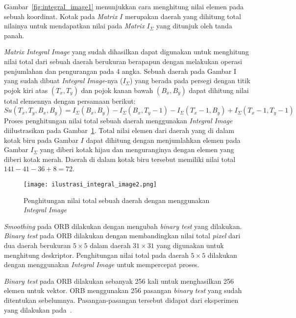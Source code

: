 Gambar~\ref{fig:integral_image1} menunjukkan cara menghitung nilai elemen pada sebuah koordinat. Kotak pada \textit{Matrix} $I$ merupakan daerah yang dihitung total nilainya untuk mendapatkan nilai pada \textit{Matrix} $I_\Sigma$ yang ditunjuk oleh tanda panah. 

\textit{Matrix Integral Image} yang sudah dihasilkan dapat digunakan untuk menghitung nilai total dari sebuah daerah berukuran berapapun dengan melakukan operasi penjumlahan dan pengurangan pada 4 angka. Sebuah daerah pada Gambar I yang sudah dibuat \textit{Integral Image}-nya ($I_\Sigma$) yang berada pada persegi dengan titik pojok kiri atas $(T_x, T_y)$ dan pojok kanan bawah $(B_x, B_y)$ dapat dihitung nilai total elemennya dengan persamaan berikut:
\begin{equation}
	Su(T_x, T_y, B_x, B_y) = I_\Sigma(B_x, B_y) - I_\Sigma(B_x, T_y-1) - I_\Sigma(T_x-1, B_y) + I_\Sigma(T_x-1,T_y-1)
\end{equation}
Proses penghitungan nilai total sebuah daerah menggunakan \textit{Integral Image} diilustrasikan pada Gambar~\ref{fig:integral_image2}. Total nilai elemen dari daerah yang di dalam kotak biru pada Gambar $I$ dapat dihitung dengan menjumlahkan elemen pada Gambar $I_\Sigma$ yang diberi kotak hijau dan menguranginya dengan elemen yang diberi kotak merah. Daerah di dalam kotak biru tersebut memiliki nilai total $141-41-36+8=72$.
\begin{figure}[H]
	\centering
	\texttt{[image: ilustrasi\_integral\_image2.png]}
	\caption{Penghitungan nilai total sebuah daerah dengan menggunakan \textit{Integral Image}}
	\label{fig:integral_image2}
\end{figure}

\textit{Smoothing} pada ORB dilakukan dengan mengubah \textit{binary test} yang dilakukan. \textit{Binary test} pada ORB dilakukan dengan membandingkan nilai total \textit{pixel} dari dua daerah berukuran $5\times5$ dalam daerah $31\times31$ yang digunakan untuk menghitung deskriptor. Penghitungan nilai total pada daerah $5\times5$ dilakukan dengan menggunakan \textit{Integral Image} untuk mempercepat proses. 

\textit{Binary test} pada ORB dilakukan sebanyak 256 kali untuk menghasilkan 256 elemen untuk vektor. ORB menggunakan 256 pasangan \textit{binary test} yang sudah ditentukan sebelumnya. Pasangan-pasangan tersebut didapat dari eksperimen yang dilakukan pada~\cite{rublee2011orb}.

